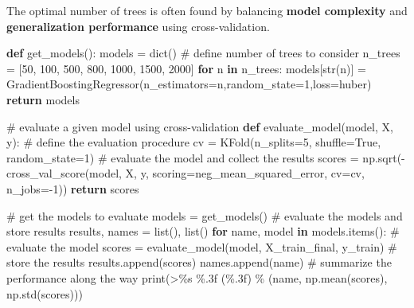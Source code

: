 \documentclass[
  letterpaper,
  DIV=11,
  numbers=noendperiod]{scrreprt}
\newenvironment{Shaded}{\begin{snugshade}}{\end{snugshade}}
\newcommand{\BuiltInTok}[1]{\textcolor[rgb]{0.00,0.23,0.31}{#1}}
\newcommand{\CommentTok}[1]{\textcolor[rgb]{0.37,0.37,0.37}{#1}}
\newcommand{\ControlFlowTok}[1]{\textcolor[rgb]{0.00,0.23,0.31}{\textbf{#1}}}
\newcommand{\DecValTok}[1]{\textcolor[rgb]{0.68,0.00,0.00}{#1}}
\newcommand{\KeywordTok}[1]{\textcolor[rgb]{0.00,0.23,0.31}{\textbf{#1}}}
\newcommand{\NormalTok}[1]{\textcolor[rgb]{0.00,0.23,0.31}{#1}}
\newcommand{\OperatorTok}[1]{\textcolor[rgb]{0.37,0.37,0.37}{#1}}
\newcommand{\SpecialCharTok}[1]{\textcolor[rgb]{0.37,0.37,0.37}{#1}}
\newcommand{\StringTok}[1]{\textcolor[rgb]{0.13,0.47,0.30}{#1}}
\newcommand{\VariableTok}[1]{\textcolor[rgb]{0.07,0.07,0.07}{#1}}
\begin{document}
The optimal number of trees is often found by balancing \textbf{model
complexity} and \textbf{generalization performance} using
cross-validation.

\begin{Shaded}
\begin{Highlighting}[]
\KeywordTok{def}\NormalTok{ get\_models():}
\NormalTok{    models }\OperatorTok{=} \BuiltInTok{dict}\NormalTok{()}
    \CommentTok{\# define number of trees to consider}
\NormalTok{    n\_trees }\OperatorTok{=}\NormalTok{ [}\DecValTok{50}\NormalTok{, }\DecValTok{100}\NormalTok{, }\DecValTok{500}\NormalTok{, }\DecValTok{800}\NormalTok{, }\DecValTok{1000}\NormalTok{, }\DecValTok{1500}\NormalTok{, }\DecValTok{2000}\NormalTok{]}
    \ControlFlowTok{for}\NormalTok{ n }\KeywordTok{in}\NormalTok{ n\_trees:}
\NormalTok{        models[}\BuiltInTok{str}\NormalTok{(n)] }\OperatorTok{=}\NormalTok{ GradientBoostingRegressor(n\_estimators}\OperatorTok{=}\NormalTok{n,random\_state}\OperatorTok{=}\DecValTok{1}\NormalTok{,loss}\OperatorTok{=}\StringTok{\textquotesingle{}huber\textquotesingle{}}\NormalTok{)}
    \ControlFlowTok{return}\NormalTok{ models}

\CommentTok{\# evaluate a given model using cross{-}validation}
\KeywordTok{def}\NormalTok{ evaluate\_model(model, X, y):}
    \CommentTok{\# define the evaluation procedure}
\NormalTok{    cv }\OperatorTok{=}\NormalTok{ KFold(n\_splits}\OperatorTok{=}\DecValTok{5}\NormalTok{, shuffle}\OperatorTok{=}\VariableTok{True}\NormalTok{, random\_state}\OperatorTok{=}\DecValTok{1}\NormalTok{)}
    \CommentTok{\# evaluate the model and collect the results}
\NormalTok{    scores }\OperatorTok{=}\NormalTok{ np.sqrt(}\OperatorTok{{-}}\NormalTok{cross\_val\_score(model, X, y, scoring}\OperatorTok{=}\StringTok{\textquotesingle{}neg\_mean\_squared\_error\textquotesingle{}}\NormalTok{, cv}\OperatorTok{=}\NormalTok{cv, n\_jobs}\OperatorTok{={-}}\DecValTok{1}\NormalTok{))}
    \ControlFlowTok{return}\NormalTok{ scores}

\CommentTok{\# get the models to evaluate}
\NormalTok{models }\OperatorTok{=}\NormalTok{ get\_models()}
\CommentTok{\# evaluate the models and store results}
\NormalTok{results, names }\OperatorTok{=} \BuiltInTok{list}\NormalTok{(), }\BuiltInTok{list}\NormalTok{()}
\ControlFlowTok{for}\NormalTok{ name, model }\KeywordTok{in}\NormalTok{ models.items():}
    \CommentTok{\# evaluate the model}
\NormalTok{    scores }\OperatorTok{=}\NormalTok{ evaluate\_model(model, X\_train\_final, y\_train)}
    \CommentTok{\# store the results}
\NormalTok{    results.append(scores)}
\NormalTok{    names.append(name)}
    \CommentTok{\# summarize the performance along the way}
    \BuiltInTok{print}\NormalTok{(}\StringTok{\textquotesingle{}\textgreater{}}\SpecialCharTok{\%s}\StringTok{ }\SpecialCharTok{\%.3f}\StringTok{ (}\SpecialCharTok{\%.3f}\StringTok{)\textquotesingle{}} \OperatorTok{\%}\NormalTok{ (name, np.mean(scores), np.std(scores)))}


\end{Highlighting}
\end{Shaded}
\end{document}
